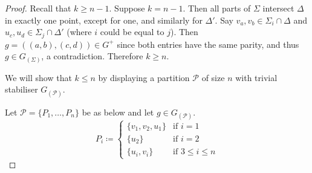 \documentclass[11pt]{amsart}
\begin{document}
\begin{proof}
Recall that $k\geqslant n-1$.
Suppose $k=n-1$. 
Then all parts of $\Sigma$ intersect $\Delta$ in exactly one point, except for one, and similarly for $\Delta'$.  Say $v_a,v_b\in \Sigma_i\cap \Delta$ and   $u_c,u_d\in \Sigma_j\cap \Delta'$ (where $i$ could  be equal to $j$). Then $g=((a,b),(c,d))\in G^+$ since both entries have the same parity, and thus $g\in G_{(\Sigma)}$, a contradiction. Therefore $k\geqslant n$.


We will show that \(k\leqslant n\) by displaying a partition \(\mathcal{P}\) of size \(n\) with trivial stabiliser \(G_{(\mathcal{P})}\). %

Let $\mathcal P = \{P_1,\ldots,P_{n}\}$ be as below and let \(g\in G_{(\mathcal{P})}\).
\begin{equation*} 
P_{i}  \coloneqq
\begin{cases}
  \{v_1,v_2,u_1\}& \text{if } i=1\\ 
   \{u_2\}& \text{if } i=2\\ 
  \{u_i,v_i\} & \text{if } 3\leqslant i\leqslant n
\end{cases}
\end{equation*}


\end{proof}
\end{document}
